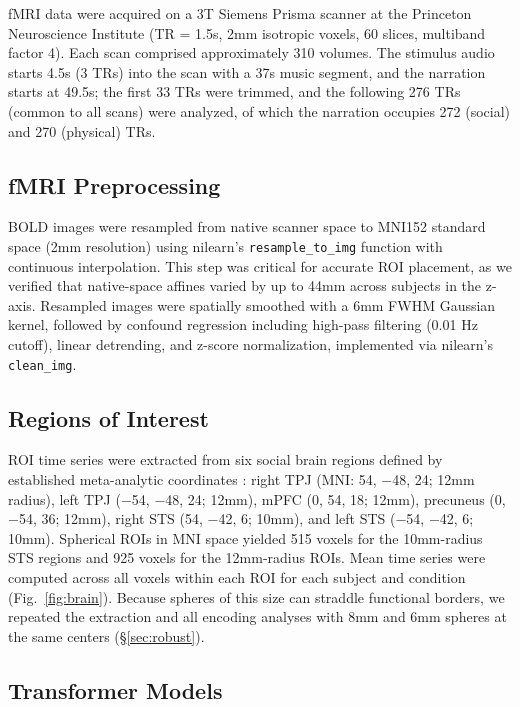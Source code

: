 \documentclass[conference]{IEEEtran}
\begin{document}
fMRI data were acquired on a 3T Siemens Prisma scanner at the Princeton Neuroscience Institute (TR = 1.5s, 2mm isotropic voxels, 60 slices, multiband factor 4). Each scan comprised approximately 310 volumes. The stimulus audio starts 4.5s (3 TRs) into the scan with a 37s music segment, and the narration starts at 49.5s; the first 33 TRs were trimmed, and the following 276 TRs (common to all scans) were analyzed, of which the narration occupies 272 (social) and 270 (physical) TRs.

\subsection{fMRI Preprocessing}

BOLD images were resampled from native scanner space to MNI152 standard space (2mm resolution) using nilearn's \texttt{resample\_to\_img} function with continuous interpolation. This step was critical for accurate ROI placement, as we verified that native-space affines varied by up to 44mm across subjects in the z-axis. Resampled images were spatially smoothed with a 6mm FWHM Gaussian kernel, followed by confound regression including high-pass filtering (0.01 Hz cutoff), linear detrending, and z-score normalization, implemented via nilearn's \texttt{clean\_img}.

\subsection{Regions of Interest}

ROI time series were extracted from six social brain regions defined by established meta-analytic coordinates \cite{schurz2014fractionating}: right TPJ (MNI: 54, $-$48, 24; 12mm radius), left TPJ ($-$54, $-$48, 24; 12mm), mPFC (0, 54, 18; 12mm), precuneus (0, $-$54, 36; 12mm), right STS (54, $-$42, 6; 10mm), and left STS ($-$54, $-$42, 6; 10mm). Spherical ROIs in MNI space yielded 515 voxels for the 10mm-radius STS regions and 925 voxels for the 12mm-radius ROIs. Mean time series were computed across all voxels within each ROI for each subject and condition (Fig.~\ref{fig:brain}). Because spheres of this size can straddle functional borders, we repeated the extraction and all encoding analyses with 8mm and 6mm spheres at the same centers (\S\ref{sec:robust}).

\subsection{Transformer Models}
\end{document}
